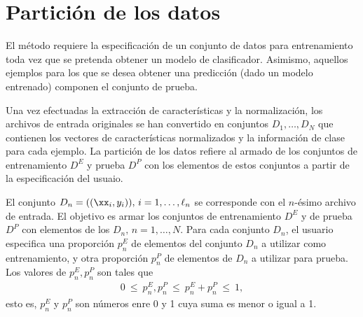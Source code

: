 %
%
%
\section{Partición de los datos}
%
El método requiere la especificación de un conjunto de datos para
entrenamiento toda vez que se pretenda obtener un modelo de
clasificador. Asimismo, aquellos ejemplos para los que se desea
obtener una predicción (dado un modelo entrenado) componen el conjunto
de prueba.

Una vez efectuadas la extracción de características y la
normalización, los archivos de entrada originales se han convertido en
conjuntos $D_1,\ldots,D_N$ que contienen los vectores de
características normalizados y la información de clase para cada
ejemplo. La partición de los datos refiere al armado de los conjuntos
de entrenamiento $D^E$ y prueba $D^P$ con los elementos de estos
conjuntos a partir de la especificación del usuaio.

El conjunto $D_n=((\xx_i,y_i)),\,i=1,\ldots,\ell_n$ se corresponde con
el $n$-ésimo archivo de entrada. El objetivo es armar los conjuntos de
entrenamiento $D^E$ y de prueba $D^P$ con elementos de los
$D_n,\,n=1,\ldots,N$.  Para cada conjunto $D_n$, el usuario especifica
una proporción $p_n^E$ de elementos del conjunto $D_n$ a utilizar como
entrenamiento, y otra proporción $p_n^P$ de elementos de $D_n$ a
utilizar para prueba. Los valores de $p_n^E,p_n^P$ son tales que
%
\begin{align}
  0\ \leq\ p_n^E, p_n^P\ \leq\  p_n^E + p_n^P\ \leq\ 1,
\end{align}
%
esto es, $p_n^E$ y $p_n^P$ son números enre 0 y 1 cuya suma es menor o
igual a 1.

